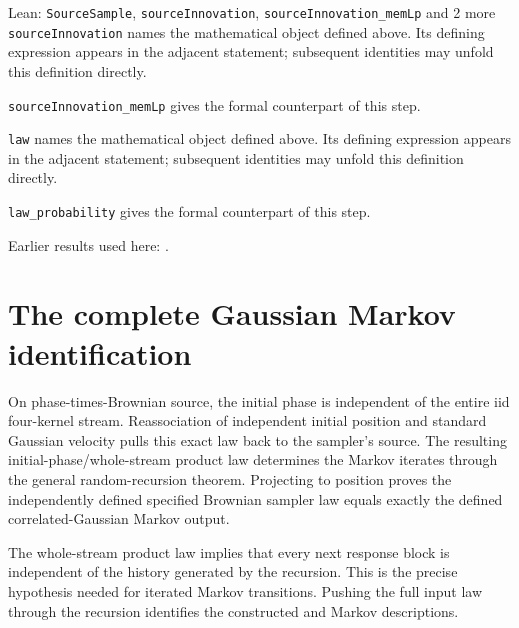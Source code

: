\documentclass[11pt,a4paper]{article}
\begin{document}
\begin{leanbox}{Lean: \texttt{SourceSample}, \texttt{sourceInnovation}, \texttt{sourceInnovation\_\allowbreak{}memLp} and 2 more}
\texttt{source\allowbreak{}Innovation} names the mathematical object defined above. Its defining expression appears in the adjacent statement; subsequent identities may unfold this definition directly.




\texttt{source\allowbreak{}Innovation\_\allowbreak{}mem\allowbreak{}Lp} gives the formal counterpart of this step.




\texttt{law} names the mathematical object defined above. Its defining expression appears in the adjacent statement; subsequent identities may unfold this definition directly.




\texttt{law\_\allowbreak{}probability} gives the formal counterpart of this step.
\end{leanbox}


Earlier results used here: \cite[Section~3.8.16]{LangevinLean2026ULASC}.

\section{\texorpdfstring{The complete Gaussian Markov identification}{The complete Gaussian Markov identification}}


On phase-times-Brownian source, the initial phase is independent of the entire iid four-kernel stream. Reassociation of independent initial position and standard Gaussian velocity pulls this exact law back to the sampler’s source. The resulting initial-phase/\allowbreak{}whole-stream product law determines the Markov iterates through the general random-recursion theorem. Projecting to position proves the independently defined specified Brownian sampler law equals exactly the defined correlated-Gaussian Markov output.



The whole-stream product law implies that every next response block is independent of the history generated by the recursion. This is the precise hypothesis needed for iterated Markov transitions. Pushing the full input law through the recursion identifies the constructed and Markov descriptions.
\end{document}
